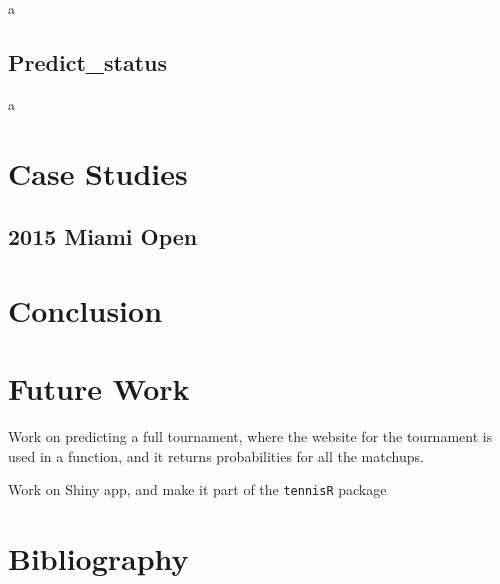 \documentclass{article}\usepackage[]{graphicx}\usepackage[]{color}
\numberwithin{equation}{section} %
\newcommand{\pkg}[1]{{\texttt{#1}}}
\begin{document}
a

\subsection{Predict\_status}

a

\section{Case Studies}

\subsection{2015 Miami Open}



\section{Conclusion}

\section{Future Work}

Work on predicting a full tournament, where the website for the tournament is used in a function, and it returns probabilities for all the matchups.

Work on Shiny app, and make it part of the \pkg{tennisR} package

\section{Bibliography}
\end{document}
